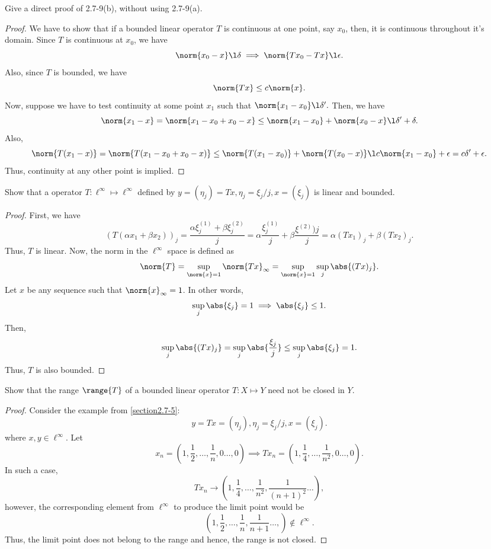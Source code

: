 \begin{question}
    Give a direct proof of 2.7-9(b), without using 2.7-9(a).
    \label{section2.7-4}
\end{question}
\begin{proof}
    We have to show that if a bounded linear operator $T$ is continuous at one point, say $x_0$, then, it is continuous throughout it's domain. Since $T$ is continuous at $x_0$, we have
    \[\norm{x_0 - x} \l \delta \implies \norm{Tx_0 - Tx} \l \epsilon.\]
    Also, since $T$ is bounded, we have
    \[\norm{Tx} \leq c \norm{x}.\]
    Now, suppose we have to test continuity at some point $x_1$ such that $\norm{x_1 - x_0} \l \delta^\prime.$ Then, we have
    \[\norm{x_1 - x} = \norm{x_1 - x_0 + x_0 - x} \leq \norm{x_1 - x_0} + \norm{x_0 - x} \l \delta^\prime + \delta.\]
    Also,
    \[\norm{T(x_1 - x)} = \norm{T(x_1 - x_0 + x_0 - x)} \leq \norm{T(x_1 - x_0)} + \norm{T(x_0 - x)} \l c\norm{x_1 - x_0} + \epsilon = c\delta^\prime + \epsilon. \]
    Thus, continuity at any other point is implied.
\end{proof}

\begin{question}
    Show that a operator $T : \ell^\infty \mapsto \ell^\infty$ defined by $y = (\eta_j) = Tx, \eta_j = \xi_j/j,x = (\xi_j)$ is linear and bounded.
    \label{section2.7-5}
\end{question}
\begin{proof}
    First, we have
    \[(T(\alpha x_1 + \beta x_2))_j = \frac{\alpha \xi^{(1)}_j + \beta \xi^{(2)}_j}{j} = \alpha\frac{\xi^{(1)}_j}{j} + \beta \frac{\xi^{(2)})j}{j} = \alpha (Tx_1)_j + \beta (Tx_2)_j.\]
    Thus, $T$ is linear. Now, the norm in the $\ell^\infty$ space is defined as
    \[\norm{T} = \sup_{\norm{x} = 1} \norm{Tx}_\infty = \sup_{\norm{x} = 1} \sup_{j} \abs{(Tx)_j}.\]
    Let $x$ be any sequence such that $\norm{x}_\infty = 1$. In other words,
    \[\sup_{j} \abs{\xi_j} = 1 \implies \abs{\xi_j} \leq 1.\]
    Then, 
    \[\sup_{j} \abs{(Tx)_j} = \sup_{j} \abs{\frac{\xi_j}{j}} \leq \sup_{j} \abs{\xi_j}  = 1.\]
    Thus, $T$ is also bounded.
\end{proof}

\begin{question}
    Show that the range $\range{T}$ of a bounded linear operator $T : X \mapsto Y$ need not be closed in $Y$.
    \label{section2.7-6}
\end{question}
\begin{proof}
    Consider the example from \ref{section2.7-5}:
    \[y = Tx = (\eta_j) , \eta_j = \xi_j / j , x = (\xi_j).\]
    where $x , y \in \ell^\infty$. Let \[x_n = \left( 1 , \frac{1}{2} , \ldots , \frac{1}{n} , 0 \ldots, 0\right) \implies Tx_n = \left( 1 , \frac{1}{4} , \ldots , \frac{1}{n^2} , 0 \ldots, 0\right).\]
    In such a case,
    \[Tx_n \rightarrow \left( 1 , \frac{1}{4} , \ldots , \frac{1}{n^2} , \frac{1}{(n+1)^2} \ldots \right),\]
    however, the corresponding element from $\ell^\infty$ to produce the limit point would be
    \[\left( 1 , \frac{1}{2} , \ldots , \frac{1}{n} , \frac{1}{n+1} \ldots, \right) \notin \ell^\infty.\]
    Thus, the limit point does not belong to the range and hence, the range is not closed.
\end{proof}

